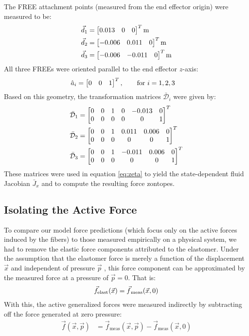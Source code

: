 The FREE attachment points (measured from the end effector origin) were measured to be:
\begin{align}
    \vec{d}_1 &= \begin{bmatrix} 0.013 & 0 & 0 \end{bmatrix}^T  \text{m}\\
    \vec{d}_2 &= \begin{bmatrix} -0.006 & 0.011 & 0 \end{bmatrix}^T  \text{m}\\
    \vec{d}_3 &= \begin{bmatrix} -0.006 & -0.011 & 0 \end{bmatrix}^T \text{m}
\end{align}
All three FREEs were oriented parallel to the end effector $z$-axis:
\begin{align}
    \hat{a}_i &= \begin{bmatrix} 0 & 0 & 1 \end{bmatrix}^T, \hspace{20pt} \text{for } i = 1,2,3
\end{align}
Based on this geometry, the transformation matrices $\bar{\mathcal{D}}_i$ were given by:
\begin{align}
    \bar{\mathcal{D}}_1 &= \begin{bmatrix} 0 & 0 & 1 & 0 & -0.013 & 0 \\ 0 & 0 & 0 & 0 & 0 & 1 \end{bmatrix}^T  \\
    \bar{\mathcal{D}}_2 &= \begin{bmatrix} 0 & 0 & 1 & 0.011 & 0.006 & 0 \\ 0 & 0 & 0 & 0 & 0 & 1 \end{bmatrix}^T  \\
    \bar{\mathcal{D}}_3 &= \begin{bmatrix} 0 & 0 & 1 & -0.011 & 0.006 & 0 \\ 0 & 0 & 0 & 0 & 0 & 1 \end{bmatrix}^T 
\end{align}
These matrices were used in equation \eqref{eq:zeta} to yield the state-dependent fluid Jacobian $\bar{J}_x$ and to compute the resulting force zontopes.



\subsection{Isolating the Active Force}
To compare our model force predictions (which focus only on the active forces induced by the fibers)
to those measured empirically on a physical system, we had to remove the elastic force components attributed to the elastomer. 
Under the assumption that the elastomer force is merely a function of the displacement $\vec{x}$ and independent of pressure $\vec{p}$ \cite{bruder2017model}, this force component can be approximated by the measured force at a pressure of $\vec{p}=0$. 
That is: 
\begin{align}
    \vec{f}_{\text{elast}} (\vec{x}) = \vec{f}_{\text{\,meas}} (\vec{x}, 0)
\end{align}
With this, the active generalized forces were measured indirectly by subtracting off the force generated at zero pressure:
\begin{align}
    \vec{f} (\vec{x}, \vec{p})  &= \vec{f}_{\text{meas}} (\vec{x}, \vec{p}) - \vec{f}_{\text{meas}} (\vec{x}, 0)     \label{eq:fiberIso}
\end{align}


